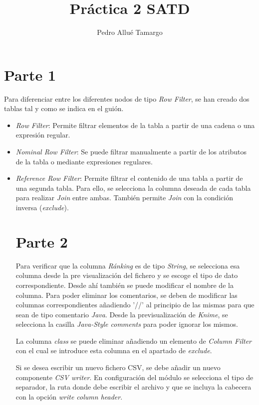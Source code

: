 \documentclass[10pt,a4paper]{article}
\begin{document}
\begin{titlepage}
\author{Pedro Allué Tamargo}
\title{Práctica 2 SATD}
\clearpage\maketitle
\thispagestyle{empty}
\tableofcontents
\end{titlepage}

\section{Parte 1}

Para diferenciar entre los diferentes nodos de tipo \textit{Row Filter}, se han creado dos tablas tal y como se indica en el guión. 
\begin{itemize}
\item\textit{Row Filter}: Permite filtrar elementos de la tabla a partir de una cadena o una expresión regular.
\item\textit{Nominal Row Filter}: Se puede filtrar manualmente a partir de los atributos de la tabla o mediante expresiones regulares.
\item\textit{Reference Row Filter}: Permite filtrar el contenido de una tabla a partir de una segunda tabla. Para ello, se selecciona la columna deseada de cada tabla para realizar \textit{Join} entre ambas. También permite \textit{Join} con la condición inversa (\textit{exclude}).  

\section{Parte 2} 
Para verificar que la columna \textit{Ránking} es de tipo \textit{String}, se selecciona esa columna desde la  pre visualización del fichero y se escoge el tipo de dato correspondiente. Desde ahí también se puede modificar el nombre de la columna. 
Para poder eliminar los comentarios, se deben de modificar las columnas correspondientes añadiendo '//' al principio de las mismas para que sean de tipo comentario \textit{Java}. Desde la previsualización de \textit{Knime}, se selecciona la casilla \textit{Java-Style comments} para poder ignorar los mismos.\par
La columna \textit{class} se puede eliminar añadiendo un elemento de \textit{Column Filter} con el cual se introduce esta columna en el apartado de \textit{exclude}. \par
Si se desea escribir un nuevo fichero CSV, se debe añadir un nuevo componente \textit{CSV writer}. En configuración del módulo se selecciona el tipo de separador, la ruta donde debe escribir el archivo y que se incluya la cabecera con la opción \textit{write column header}.


\end{itemize}
\end{document}
